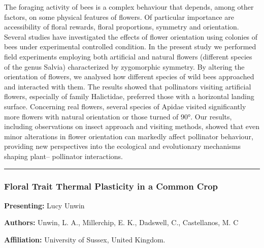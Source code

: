 \documentclass[
  letterpaper,
  DIV=11,
  numbers=noendperiod]{scrartcl}
\begin{document}
The foraging activity of bees is a complex behaviour that depends, among
other factors, on some physical features of flowers. Of particular
importance are accessibility of floral rewards, floral proportions,
symmetry and orientation. Several studies have investigated the effects
of flower orientation using colonies of bees under experimental
controlled condition. In the present study we performed field
experiments employing both artificial and natural flowers (different
species of the genus Salvia) characterized by zygomorphic symmetry. By
altering the orientation of flowers, we analysed how different species
of wild bees approached and interacted with them. The results showed
that pollinators visiting artificial flowers, especially of family
Halictidae, preferred those with a horizontal landing surface.
Concerning real flowers, several species of Apidae visited significantly
more flowers with natural orientation or those turned of 90°. Our
results, including observations on insect approach and visiting methods,
showed that even minor alterations in flower orientation can markedly
affect pollinator behaviour, providing new perspectives into the
ecological and evolutionary mechanisms shaping plant-- pollinator
interactions.

\begin{center}\rule{0.5\linewidth}{0.5pt}\end{center}

\subsubsection{Floral Trait Thermal Plasticity in a Common
Crop}\label{floral-trait-thermal-plasticity-in-a-common-crop}

\textbf{Presenting:} Lucy Unwin

\textbf{Authors:} Unwin, L. A., Millerchip, E. K., Dadswell, C.,
Castellanos, M. C

\textbf{Affiliation:} University of Sussex, United Kingdom.
\end{document}
